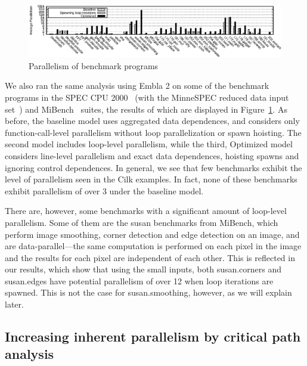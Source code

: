 \begin{figure}[t]
 \centering
\includegraphics[width=5in]{benches}
\caption{Parallelism of benchmark programs}
\label{benchmarks}
\end{figure}

We also ran the same analysis using Embla 2 on some of the benchmark programs in the SPEC CPU 2000~\cite{henning00spec} (with the MinneSPEC reduced data input set~\cite{KleinOsowski02minnespec}) and MiBench~\cite{guthaus01mibench} suites, the results of which are displayed in Figure~\ref{benchmarks}.
As before, the baseline model uses aggregated data dependences, and considers only function-call-level parallelism without loop parallelization or spawn hoisting.
The second model includes loop-level parallelism, while the third, \textsf{Optimized} model considers line-level parallelism and exact data dependences, hoisting spawns and ignoring control dependences.
In general, we see that few benchmarks exhibit the level of parallelism seen in the Cilk examples.
In fact, none of these benchmarks exhibit parallelism of over 3 under the baseline model.

There are, however, some benchmarks with a significant amount of loop-level parallelism.
Some of them are the \textsf{susan} benchmarks from MiBench, which perform image smoothing, corner detection and edge detection on an image, and are data-parallel---the same computation is performed on each pixel in the image and the results for each pixel are independent of each other.
This is reflected in our results, which show that using the small inputs, both \textsf{susan.corners} and \textsf{susan.edges} have potential parallelism of over 12 when loop iterations are spawned.
This is not the case for \textsf{susan.smoothing}, however, as we will explain later.

\subsection{Increasing inherent parallelism by critical path analysis} \label{sresults:increasing}

